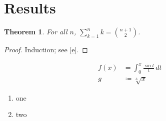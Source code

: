\documentclass{article}
\newtheorem{thm}{Theorem}[section]
\begin{document}
\section{Results}
\begin{thm}\label{t}For all $n$, $\sum_{k=1}^n k = \binom{n+1}{2}$.\end{thm}
\begin{proof}Induction; see \eqref{e}.\end{proof}
\begin{align}\label{e} f(x) &= \int_0^x \frac{\sin t}{t}\,dt \\ g &\coloneqq \sqrt[3]{x}\end{align}
\begin{enumerate}[label=(\alph*)]\item one \item two\end{enumerate}
\end{document}
